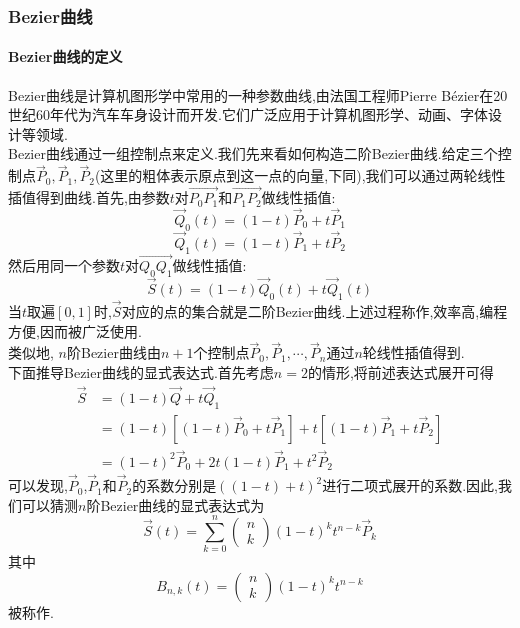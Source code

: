 \documentclass{ctexart}
\begin{document}
\subsubsection{Bezier曲线}
\paragraph{Bezier曲线的定义}
Bezier曲线是计算机图形学中常用的一种参数曲线,由法国工程师Pierre Bézier在20世纪60年代为汽车车身设计而开发.它们广泛应用于计算机图形学、动画、字体设计等领域.\\
\indent Bezier曲线通过一组控制点来定义.我们先来看如何构造二阶Bezier曲线.给定三个控制点$\vec{P}_0,\vec{P}_1,\vec{P}_2$(这里的粗体表示原点到这一点的向量,下同),我们可以通过两轮线性插值得到曲线.首先,由参数$t$对$\overrightarrow{P_0P_1}$和$\overrightarrow{P_1P_2}$做线性插值:
\[\vec{Q}_0(t)=(1-t)\vec{P}_0+t\vec{P}_1\]
\[\vec{Q}_1(t)=(1-t)\vec{P}_1+t\vec{P}_2\]
然后用同一个参数$t$对$\overrightarrow{Q_0Q_1}$做线性插值:
\[\vec{S}(t)=(1-t)\vec{Q}_0(t)+t\vec{Q}_1(t)\]
当$t$取遍$[0,1]$时,$\vec{S}$对应的点的集合就是二阶Bezier曲线.上述过程称作,效率高,编程方便,因而被广泛使用.\\
\indent 类似地, $n$阶Bezier曲线由$n+1$个控制点$\vec{P}_0,\vec{P}_1,\cdots,\vec{P}_n$通过$n$轮线性插值得到.\\
\indent 下面推导Bezier曲线的显式表达式.首先考虑$n=2$的情形,将前述表达式展开可得
\[\begin{aligned}
    \vec{S}
    &= (1-t)\vec{Q}+t\vec{Q}_1\\
    &= (1-t)\left[(1-t)\vec{P}_0+t\vec{P}_1\right]+t\left[(1-t)\vec{P}_1+t\vec{P}_2\right]\\
    &= (1-t)^2\vec{P}_0+2t(1-t)\vec{P}_1+t^2\vec{P}_2
\end{aligned}\]
可以发现,$\vec{P}_0$,$\vec{P}_1$和$\vec{P}_2$的系数分别是$((1-t)+t)^2$进行二项式展开的系数.因此,我们可以猜测$n$阶Bezier曲线的显式表达式为
\[\vec{S}(t)=\sum_{k=0}^{n}\begin{pmatrix}n\\k\end{pmatrix}(1-t)^kt^{n-k}\vec{P}_k\]
其中
\[B_{n,k}(t)=\begin{pmatrix}n\\k\end{pmatrix}(1-t)^kt^{n-k}\]
被称作.
\end{document}
